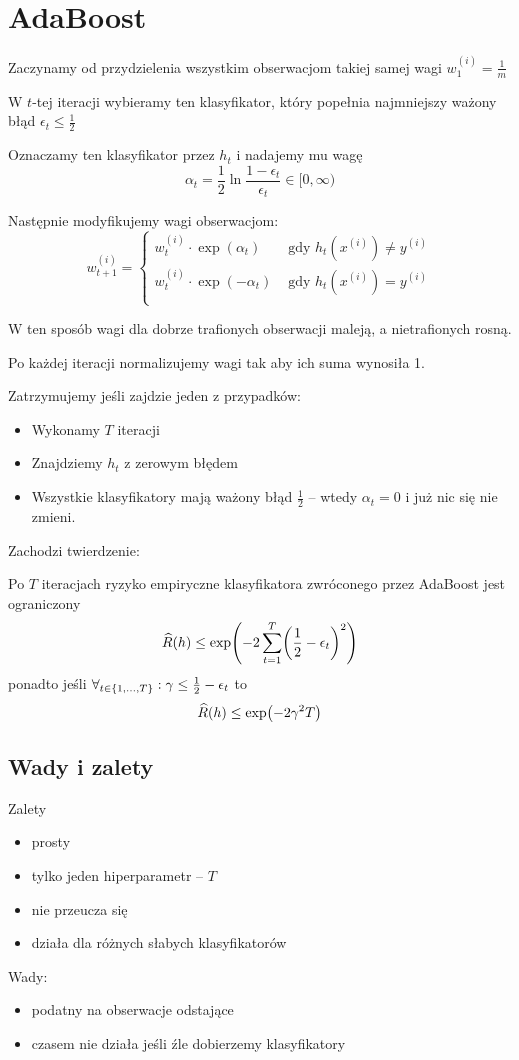 \section{AdaBoost}

Zaczynamy od przydzielenia wszystkim obserwacjom takiej samej wagi \( w^{(i)}_1 = \frac{1}{m} \)

W \(t\)-tej iteracji wybieramy ten klasyfikator, który popełnia najmniejszy ważony błąd \( \epsilon_t \leq \frac{1}{2} \)

Oznaczamy ten klasyfikator przez \( h_t \) i nadajemy mu wagę
\[
	\alpha_t = \frac{1}{2} \ln \frac{1 - \epsilon_t}{\epsilon_t} \in [0, \infty)
\]

Następnie modyfikujemy wagi obserwacjom:
\[
	w^{(i)}_{t + 1} = \begin{cases}
		w^{(i)}_t \cdot \exp(\alpha_t)  & \text{ gdy } h_t(x^{(i)}) \neq y^{(i)} \\
		w^{(i)}_t \cdot \exp(-\alpha_t) & \text{ gdy } h_t(x^{(i)}) = y^{(i)}    \\
	\end{cases}
\]

W ten sposób wagi dla dobrze trafionych obserwacji maleją, a nietrafionych rosną.

Po każdej iteracji normalizujemy wagi tak aby ich suma wynosiła 1.

Zatrzymujemy jeśli zajdzie jeden z przypadków:
\begin{itemize}
	\item Wykonamy \( T \) iteracji
	\item Znajdziemy \( h_t \) z zerowym błędem
	\item Wszystkie klasyfikatory mają ważony błąd \( \frac{1}{2} \) -- wtedy \( \alpha_t = 0 \) i już nic się nie zmieni.
\end{itemize}

Zachodzi twierdzenie:
\begin{theorem}
	Po \( T \) iteracjach ryzyko empiryczne klasyfikatora zwróconego przez AdaBoost jest ograniczony
	\[
		\widehat R(h) \leq \exp\pars{-2\sum_{t=1}^T \pars{\frac{1}{2} - \epsilon_t}^2}
	\]
	ponadto jeśli \( \forall_{t \in \set{1, \dots, T}} : \gamma \leq \frac{1}{2} - \epsilon_t \)
	to
	\[
		\widehat R(h) \leq \exp\pars{-2\gamma^2T}
	\]
\end{theorem}

\subsection{Wady i zalety}

Zalety
\begin{itemize}
	\item prosty
	\item tylko jeden hiperparametr -- \( T \)
	\item nie przeucza się
	\item działa dla różnych słabych klasyfikatorów
\end{itemize}

Wady:
\begin{itemize}
	\item podatny na obserwacje odstające
	\item czasem nie działa jeśli źle dobierzemy klasyfikatory
\end{itemize}